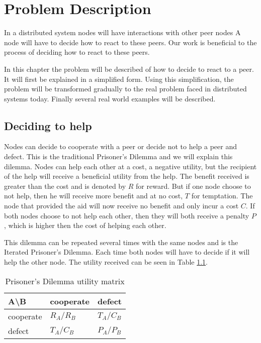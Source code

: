 \chapter{Problem Description}
In a distributed system nodes will have interactions with other peer nodes
A node will have to decide how to react to these peers.
Our work is beneficial to the process of deciding how to react to these peers.

In this chapter the problem will be described of how to decide to react to a peer.
It will first be explained in a simplified form.
Using this simplification, the problem will be transformed gradually
to the real problem faced in distributed systems today.
Finally several real world examples will be described.

\section{Deciding to help}
Nodes can decide to cooperate with a peer or decide not to help a peer and defect.
This is the traditional Prisoner's Dilemma 
and we will explain this dilemma\cite{Nowak-PrisonerDilemma}\cite{Lai-Incentives}.
Nodes can help each other at a cost, a negative utility, 
but the recipient of the help will receive a beneficial utility from the help.
The benefit received is greater than the cost and is denoted by $R$ for reward.
But if one node choose to not help, then he will receive more benefit and at no cost, $T$ for temptation.
The node that provided the aid will now receive no benefit and only incur a cost $C$.
If both nodes choose to not help each other, 
then they will both receive a penalty $P$, which is higher then the cost of helping each other.

This dilemma can be repeated several times with the same nodes and is the Iterated Prisoner's Dilemma.
Each time both nodes will have to decide if it will help the other node.
The utility received can be seen in Table \ref{tab:pd-um}.

\begin{table}[h]
\center
	\begin{tabular}{l|ll}
	A\textbackslash B       & cooperate  & defect     \\ \hline
	cooperate & $R_A /R_B$ & $T_A /C_B$ \\
	defect    & $T_A /C_B$ & $P_A /P_B$
	\end{tabular}
\caption{Prisoner's Dilemma utility matrix}
\label{tab:pd-um}
\end{table}

